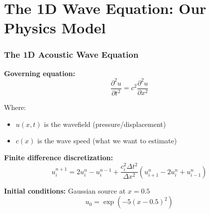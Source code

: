 \documentclass[notes]{beamer}
\begin{document}
\section{The 1D Wave Equation: Our Physics Model}

\begin{frame}
\frametitle{The 1D Acoustic Wave Equation}

\textbf{Governing equation:}
\begin{equation*}
\frac{\partial^2 u}{\partial t^2} = c^2 \frac{\partial^2 u}{\partial x^2}
\end{equation*}

Where:
\begin{itemize}
    \item $u(x,t)$ is the wavefield (pressure/displacement)
    \item $c(x)$ is the wave speed (what we want to estimate)
\end{itemize}

\vspace{1cm}

\textbf{Finite difference discretization:}
\begin{equation*}
u_{i}^{n+1} = 2u_{i}^{n} - u_{i}^{n-1} + \frac{c_i^2 \Delta t^2}{\Delta x^2}(u_{i+1}^{n} - 2u_{i}^{n} + u_{i-1}^{n})
\end{equation*}

\textbf{Initial conditions:} Gaussian source at $x = 0.5$
\begin{equation*}
u_0 = \exp(-5(x - 0.5)^2)
\end{equation*}

\end{frame}
\end{document}

